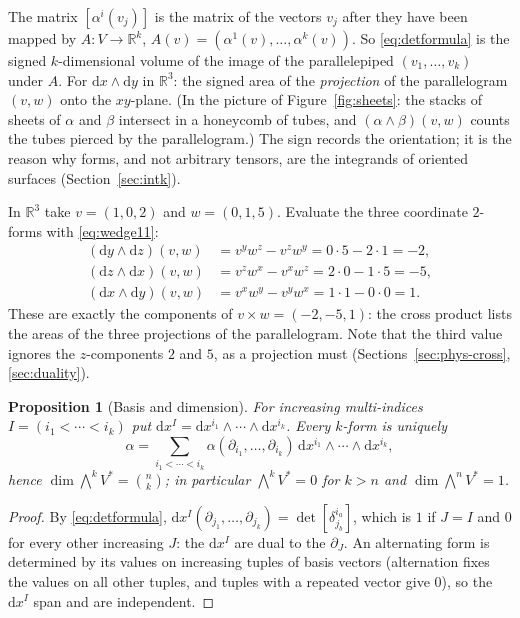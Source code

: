 \documentclass[11pt,a4paper]{article}
\newcounter{thm}[section]
\numberwithin{equation}{section}
\theoremstyle{definition}
\theoremstyle{plain}
\newtheorem{proposition}[thm]{Proposition}
\newcommand{\R}{\mathbb{R}}
\newcommand{\dd}{\mathrm{d}}
\begin{document}
\begin{intuition}
The matrix $[\alpha^i(v_j)]$ is the matrix of the vectors $v_j$ after they have been mapped by
$A:V\to\R^k$, $A(v)=(\alpha^1(v),\dots,\alpha^k(v))$. So \eqref{eq:detformula} is the signed $k$-dimensional volume of the image
of the parallelepiped $(v_1,\dots,v_k)$ under $A$. For $\dd x\wedge\dd y$ in $\R^3$: the signed area of the \emph{projection} of
the parallelogram $(v,w)$ onto the $xy$-plane. (In the picture of Figure~\ref{fig:sheets}: the stacks of sheets of $\alpha$ and
$\beta$ intersect in a honeycomb of tubes, and $(\alpha\wedge\beta)(v,w)$ counts the tubes pierced by the parallelogram.)
The sign records the orientation; it is the reason why forms, and not arbitrary tensors, are the integrands of oriented surfaces
(Section~\ref{sec:intk}).
\end{intuition}

\begin{example}\label{ex:projareas}
In $\R^3$ take $v=(1,0,2)$ and $w=(0,1,5)$. Evaluate the three coordinate $2$-forms with \eqref{eq:wedge11}:
\begin{align*}
(\dd y\wedge\dd z)(v,w)&=v^yw^z-v^zw^y=0\cdot5-2\cdot1=-2,\\
(\dd z\wedge\dd x)(v,w)&=v^zw^x-v^xw^z=2\cdot0-1\cdot5=-5,\\
(\dd x\wedge\dd y)(v,w)&=v^xw^y-v^yw^x=1\cdot1-0\cdot0=1.
\end{align*}
These are exactly the components of $v\times w=(-2,-5,1)$: the cross product lists the areas of the three projections of the
parallelogram. Note that the third value ignores the $z$-components $2$ and $5$, as a projection must
(Sections~\ref{sec:phys-cross}, \ref{sec:duality}).
\end{example}

\begin{proposition}[Basis and dimension]\label{prop:formbasis}
For increasing multi-indices $I=(i_1<\cdots<i_k)$ put $\dd x^I=\dd x^{i_1}\wedge\cdots\wedge\dd x^{i_k}$. Every $k$-form is uniquely
\[
\alpha=\sum_{i_1<\cdots<i_k}\alpha(\partial_{i_1},\dots,\partial_{i_k})\,\dd x^{i_1}\wedge\cdots\wedge\dd x^{i_k},
\]
hence $\dim\bigwedge^kV^*=\binom nk$; in particular $\bigwedge^kV^*=0$ for $k>n$ and $\dim\bigwedge^nV^*=1$.
\end{proposition}
\begin{proof}
By \eqref{eq:detformula}, $\dd x^I(\partial_{j_1},\dots,\partial_{j_k})=\det[\delta^{i_a}_{j_b}]$, which is $1$ if $J=I$ and $0$ for every
other increasing $J$: the $\dd x^I$ are dual to the $\partial_J$. An alternating form is determined by its values on increasing
tuples of basis vectors (alternation fixes the values on all other tuples, and tuples with a repeated vector give $0$), so the
$\dd x^I$ span and are independent.
\end{proof}
\end{document}
